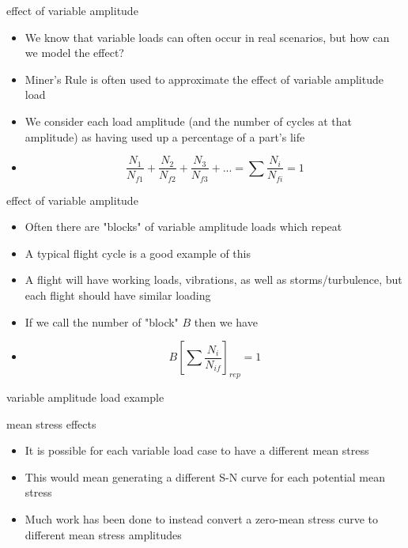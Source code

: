 \documentclass[10pt]{beamer}
\begin{document}
\begin{frame}{effect of variable amplitude}
	\begin{itemize}[<+->]
		\item We know that variable loads can often occur in real scenarios, but how can we model the effect?
		\item Miner's Rule is often used to approximate the effect of variable amplitude load
		\item We consider each load amplitude (and the number of cycles at that amplitude) as having used up a percentage of a part's life
		\item[] \begin{equation}
		\frac{N_1}{N_{f1}} + \frac{N_2}{N_{f2}} + \frac{N_3}{N_{f3}} + ... = \sum \frac{N_i}{N_{fi}} = 1
		\end{equation}
	\end{itemize}
\end{frame}

\begin{frame}{effect of variable amplitude}
	\begin{itemize}[<+->]
		\item Often there are "blocks" of variable amplitude loads which repeat
		\item A typical flight cycle is a good example of this
		\item A flight will have working loads, vibrations, as well as storms/turbulence, but each flight should have similar loading
		\item If we call the number of "block" $B$ then we have
		\item[] \begin{equation}
		B \left[\sum \frac{N_i}{N_{if}}\right]_{rep} = 1
		\end{equation}
	\end{itemize}
\end{frame}

\begin{frame}{variable amplitude load example}
\end{frame}

\begin{frame}{mean stress effects}
	\begin{itemize}[<+->]
		\item It is possible for each variable load case to have a different mean stress
		\item This would mean generating a different S-N curve for each potential mean stress
		\item Much work has been done to instead convert a zero-mean stress curve to different mean stress amplitudes
	\end{itemize}
\end{frame}
\end{document}
